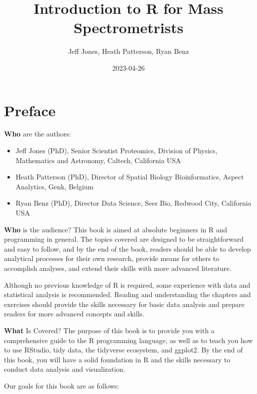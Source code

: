 \documentclass[
]{book}
\title{Introduction to R for Mass Spectrometrists}
\author{Jeff Jones, Heath Patterson, Ryan Benz}
\date{2023-04-26}
\begin{document}
\maketitle

{
\setcounter{tocdepth}{1}
\tableofcontents
}
\hypertarget{preface}{%
\chapter*{Preface}\label{preface}}

\textbf{Who} are the authors:

\begin{itemize}
\item
  Jeff Jones (PhD), Senior Scientist Proteomics, Division of Physics, Mathematics and Astronomy, Caltech, California USA
\item
  Heath Patterson (PhD), Director of Spatial Biology Bioinformatics, Aspect Analytics, Genk, Belgium
\item
  Ryan Benz (PhD), Director Data Science, Seer Bio, Redwood City, California USA
\end{itemize}

\textbf{Who} is the audience? This book is aimed at absolute beginners in R and programming in general. The topics covered are designed to be straightforward and easy to follow, and by the end of the book, readers should be able to develop analytical processes for their own research, provide means for others to accomplish analyses, and extend their skills with more advanced literature.

Although no previous knowledge of R is required, some experience with data and statistical analysis is recommended. Reading and understanding the chapters and exercises should provide the skills necessary for basic data analysis and prepare readers for more advanced concepts and skills.

\textbf{What} Is Covered? The purpose of this book is to provide you with a comprehensive guide to the R programming language, as well as to teach you how to use RStudio, tidy data, the tidyverse ecosystem, and ggplot2. By the end of this book, you will have a solid foundation in R and the skills necessary to conduct data analysis and visualization.

Our goals for this book are as follows:
\end{document}
